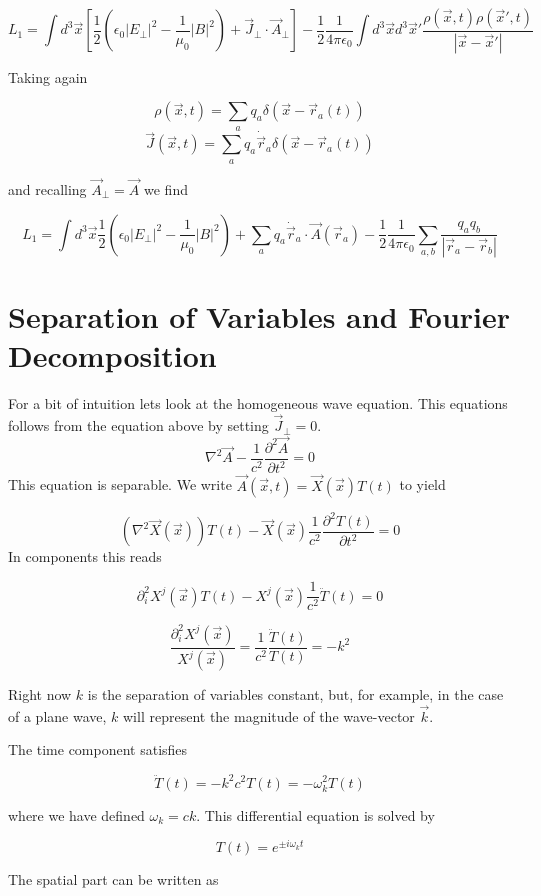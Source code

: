 \documentclass[12pt]{article}
\newcommand{\pardiv}[2][]{\frac{\partial #1}{\partial #2}}
\begin{document}
\[ L_1 = \int d^3 \vec{x} \left[ \frac{1}{2} \left(\epsilon_0 |E_{\perp}|^2 - \frac{1}{\mu_0} |B|^2\right) + \vec{J}_{\perp} \cdot \vec{A}_{\perp} \right] -\frac{1}{2} \frac{1}{4\pi \epsilon_0} \int d^3\vec{x} d^3 \vec{x}' \frac{\rho(\vec{x},t) \rho(\vec{x}',t)}{|\vec{x}-\vec{x}'|} \]

Taking again

\[ \rho(\vec{x},t) = \sum_{a} q_{a} \delta(\vec{x} - \vec{r}_{a}(t))\]
\[ \vec{J}(\vec{x},t) = \sum_{a} q_{a} \dot{\vec{r}}_{a}\delta(\vec{x}-\vec{r}_{a}(t)) \]

and recalling $\vec{A}_{\perp} = \vec{A}$ we find

\[L_1 = \int d^3 \vec{x} \frac{1}{2} \left(\epsilon_0 |E_{\perp}|^2 - \frac{1}{\mu_0} |B|^2\right) + \sum_{a} q_a \dot{\vec{r}}_a\cdot\vec{A}(\vec{r}_a) - \frac{1}{2}\frac{1}{4\pi \epsilon_0} \sum_{a,b} \frac{q_a q_b}{|\vec{r}_a-\vec{r}_b|}\]

\section{Separation of Variables and Fourier Decomposition}

For a bit of intuition lets look at the homogeneous wave equation. This equations follows from the equation above by setting $\vec{J}_{\perp}=0$.
\[ \nabla^2 \vec{A} - \frac{1}{c^2}\pardiv[^2\vec{A}]{t^2} = 0 \]
This equation is separable. We write $\vec{A}(\vec{x},t) = \vec{X}(\vec{x})T(t)$ to yield

\[(\nabla^2 \vec{X}(\vec{x}))T(t) - \vec{X}(\vec{x})\frac{1}{c^2}\pardiv[^2 T(t)]{t^2}=0 \]
In components this reads

\[\partial_i^2 X^j(\vec{x})T(t) - X^j(\vec{x})\frac{1}{c^2}\ddot{T}(t) = 0\]

\[ \frac{\partial_i^2 X^j(\vec{x})}{X^j(\vec{x})} = \frac{1}{c^2} \frac{\ddot{T}(t)}{T(t)} = -k^2 \]

Right now $k$ is the separation of variables constant, but, for example, in the case of a plane wave, $k$ will represent the magnitude of the wave-vector $\vec{k}$.

The time component satisfies

\[ \ddot{T}(t) = -k^2c^2 T(t) = -\omega_k^2 T(t)  \]

where we have defined $\omega_k=ck$. This differential equation is solved by

\[T(t) = e^{\pm i \omega_k t}\]

The spatial part can be written as
\end{document}
